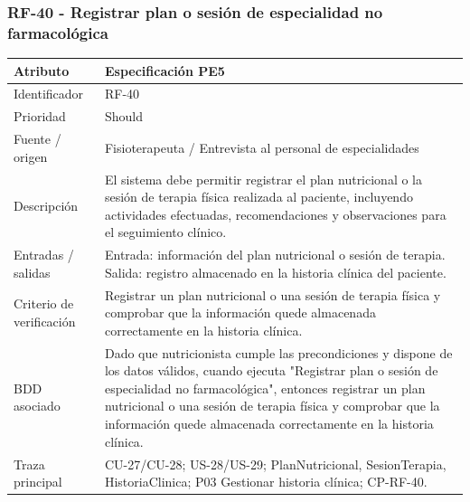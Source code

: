 \documentclass[11pt,a4paper]{article}
\begin{document}
\subsubsection{RF-40 - Registrar plan o sesión de especialidad no farmacológica}
	\begin{tabularx}{\textwidth}{p{3.2cm}Y}
		\toprule
		\textbf{Atributo} & \textbf{Especificación PE5}\\\midrule
		Identificador & RF-40\\
		Prioridad & Should\\
		Fuente / origen & Fisioterapeuta / Entrevista al personal de especialidades\\
		Descripción & El sistema debe permitir registrar el plan nutricional o la sesión de terapia física realizada al paciente, incluyendo actividades efectuadas, recomendaciones y observaciones para el seguimiento clínico.\\
		Entradas / salidas & Entrada: información del plan nutricional o sesión de terapia. Salida: registro almacenado en la historia clínica del paciente.\\
		Criterio de verificación & Registrar un plan nutricional o una sesión de terapia física y comprobar que la información quede almacenada correctamente en la historia clínica.\\
		BDD asociado & Dado que nutricionista cumple las precondiciones y dispone de los datos válidos, cuando ejecuta "Registrar plan o sesión de especialidad no farmacológica", entonces registrar un plan nutricional o una sesión de terapia física y comprobar que la información quede almacenada correctamente en la historia clínica.\\
		Traza principal & CU-27/CU-28; US-28/US-29; PlanNutricional, SesionTerapia, HistoriaClinica; P03 Gestionar historia clínica; CP-RF-40.\\
		\bottomrule
	\end{tabularx}
	\clearpage
\end{document}
